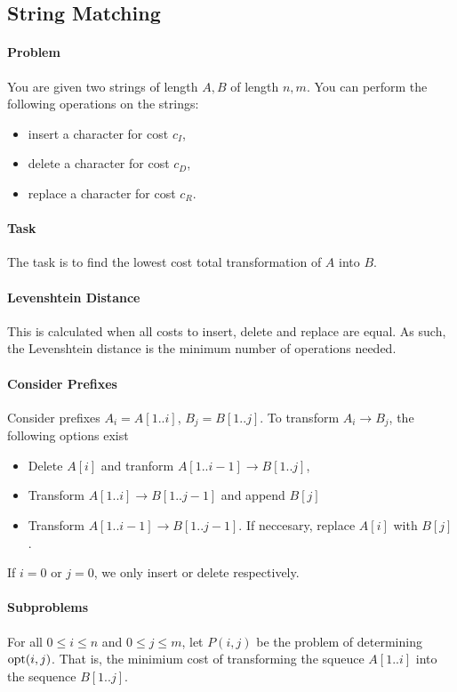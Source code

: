 \subsection{String Matching}

\paragraph{Problem}
You are given two strings of length  \(A, B\) of length  \(n, m\).
You can perform the following operations on the strings:
\begin{itemize}
  \item insert a character for cost \(c_I\),
  \item delete a character for cost \(c_D\),
  \item replace a character for cost \(c_R\).
\end{itemize}

\paragraph{Task}
The task is to find the lowest cost total transformation of \(A\) into  \(B\).

\paragraph{Levenshtein Distance}
This is calculated when all costs to insert, delete and replace are equal.
As such, the Levenshtein distance is the minimum number of operations needed.

\paragraph{Consider Prefixes}
Consider prefixes \(A_i = A[1..i]\),  \(B_j = B[1..j]\). 
To transform \(A_i \to B_j\), the following options exist
\begin{itemize}
  \item Delete \(A[i]\) and tranform  \(A[1..i-1] \to  B[1..j]\),
  \item Transform \(A[1..i] \to  B[1..j-1]\) and append \(B[j]\)
  \item Transform  \(A[1..i-1] \to  B[1..j - 1]\). If neccesary, replace
    \(A[i]\) with \(B[j]\).
\end{itemize}
If \(i = 0\) or  \(j = 0\), we only insert or delete respectively.

\paragraph{Subproblems}
For all \(0 \leq i \leq n\) and \(0 \leq j \leq m\), let  \(P(i, j)\) be the
problem of determining  \(\mathrm{opt}(i, j)\). That is, the minimium cost of
transforming the squeuce \(A[1..i]\) into the sequence \(B[1..j]\).

